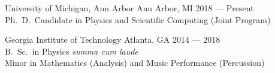 
\begin{minipage}[t]{0.2\textwidth}
	\flushleft
\end{minipage}
\begin{minipage}[t]{0.8\textwidth}
	\education
	{University of Michigan, Ann Arbor}
	{Ann Arbor, MI}
	{
  2018 --- Present\\
	Ph.\ D.\ Candidate in Physics and Scientific Computing (Joint Program)
  }

  \vspace*{4pt}

	\education
	{Georgia Institute of Technology}
	{Atlanta, GA}
	{
  2014 --- 2018\\
	B.\ Sc.\ in Physics \textit{summa cum laude}\\
  Minor in Mathematics (Analysis) and Music Performance (Percussion)
  }
\end{minipage}

\vspace{8pt}
